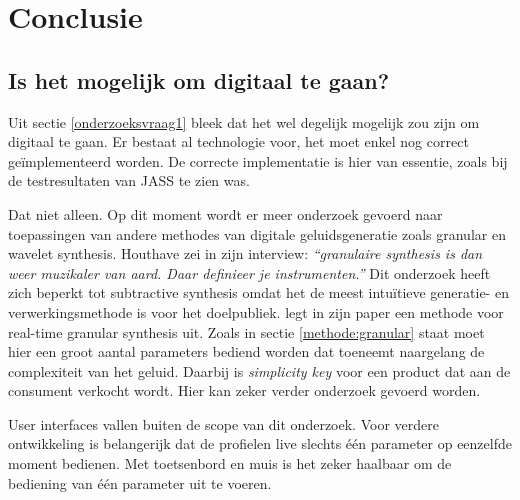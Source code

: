 
\chapter{Conclusie}
\label{ch:conclusie}


\section{Is het mogelijk om digitaal te gaan?}

Uit sectie \ref{onderzoeksvraag1} bleek dat het wel degelijk mogelijk zou zijn om digitaal te gaan. Er bestaat al technologie voor, het moet enkel nog correct geïmplementeerd worden. De correcte implementatie is hier van essentie, zoals bij de testresultaten van JASS te zien was.

Dat niet alleen. Op dit moment wordt er meer onderzoek gevoerd naar toepassingen van andere methodes van digitale geluidsgeneratie zoals granular en wavelet synthesis. Houthave zei in zijn interview: \textit{``granulaire synthesis is dan weer muzikaler van aard. Daar definieer je instrumenten.''} \autocite{thomashouthave} Dit onderzoek heeft zich beperkt tot subtractive synthesis omdat het de meest intuïtieve generatie- en verwerkingsmethode is voor het doelpubliek. \textcite{granular} legt in zijn paper een methode voor real-time granular synthesis uit. Zoals in sectie \ref{methode:granular} staat moet hier een groot aantal parameters bediend worden dat toeneemt naargelang de complexiteit van het geluid. Daarbij is \textit{simplicity key} voor een product dat aan de consument verkocht wordt. Hier kan zeker verder onderzoek gevoerd worden.

User interfaces vallen buiten de scope van dit onderzoek. Voor verdere ontwikkeling is belangerijk dat de profielen live slechts één parameter op eenzelfde moment bedienen. Met toetsenbord en muis is het zeker haalbaar om de bediening van één parameter uit te voeren.

